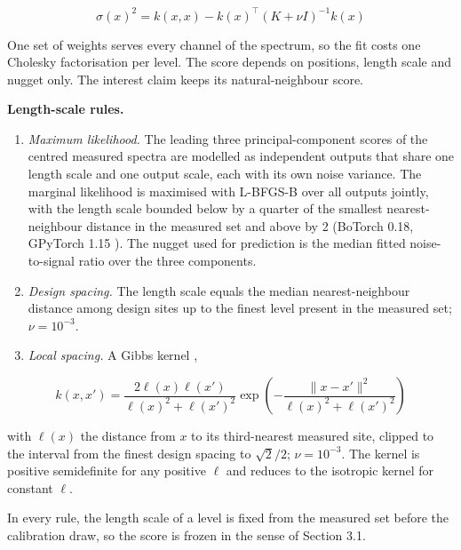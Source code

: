 \documentclass{iopjournal}
\providecommand{\tightlist}{\setlength{\itemsep}{0pt}\setlength{\parskip}{0pt}}
\begin{document}
\[
\sigma(x)^2 = k(x, x) - k(x)^\top (K + \nu I)^{-1} k(x)
\]

One set of weights serves every channel of the spectrum, so the fit costs one Cholesky factorisation per level. The score depends on positions, length scale and nugget only. The interest claim keeps its natural-neighbour score.

\textbf{Length-scale rules.}

\begin{enumerate}
\def\labelenumi{\arabic{enumi}.}
\tightlist
\item
  \emph{Maximum likelihood.} The leading three principal-component scores of the centred measured spectra are modelled as independent outputs that share one length scale and one output scale, each with its own noise variance. The marginal likelihood is maximised with L-BFGS-B over all outputs jointly, with the length scale bounded below by a quarter of the smallest nearest-neighbour distance in the measured set and above by 2 (BoTorch 0.18, GPyTorch 1.15 \cite{Balandat2020,Gardner2018}). The nugget used for prediction is the median fitted noise-to-signal ratio over the three components.
\item
  \emph{Design spacing.} The length scale equals the median nearest-neighbour distance among design sites up to the finest level present in the measured set; \(\nu = 10^{-3}\).
\item
  \emph{Local spacing.} A Gibbs kernel \cite{Gibbs1997,PaciorekSchervish2004},
\end{enumerate}

\[
k(x, x') = \frac{2 \ell(x) \ell(x')}{\ell(x)^2 + \ell(x')^2} \exp\left(-\frac{\lVert x - x' \rVert^2}{\ell(x)^2 + \ell(x')^2}\right)
\]

with \(\ell(x)\) the distance from \(x\) to its third-nearest measured site, clipped to the interval from the finest design spacing to \(\sqrt{2}/2\); \(\nu = 10^{-3}\). The kernel is positive semidefinite for any positive \(\ell\) and reduces to the isotropic kernel for constant \(\ell\).

In every rule, the length scale of a level is fixed from the measured set before the calibration draw, so the score is frozen in the sense of Section 3.1.
\end{document}
